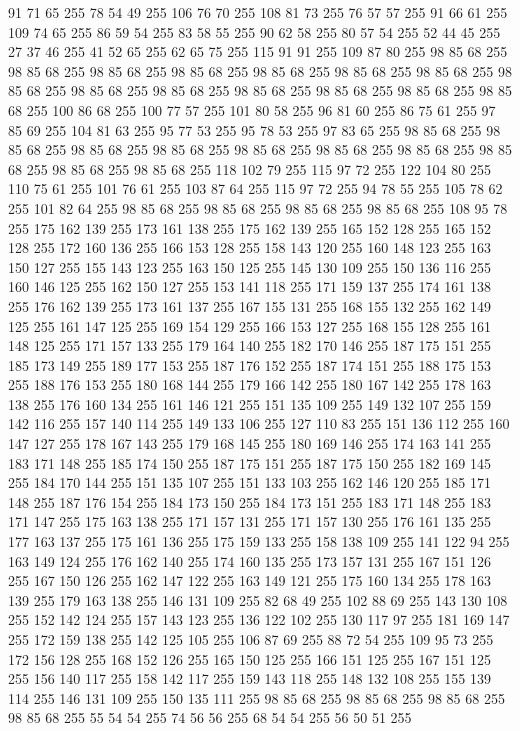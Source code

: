 91 71 65 255 78 54 49 255 106 76 70 255 108 81 73 255 76 57 57 255 91 66 61 255 109 74 65 255 86 59 54 255 83 58 55 255 90 62 58 255 80 57 54 255 52 44 45 255 27 37 46 255 41 52 65 255 62 65 75 255 115 91 91 255 109 87 80 255 98 85 68 255 98 85 68 255 98 85 68 255 98 85 68 255 98 85 68 255 98 85 68 255 98 85 68 255 98 85 68 255 98 85 68 255 98 85 68 255 98 85 68 255 98 85 68 255 98 85 68 255 98 85 68 255 100 86 68 255 100 77 57 255 101 80 58 255 96 81 60 255 86 75 61 255 97 85 69 255 104 81 63 255 95 77 53 255 95 78 53 255 97 83 65 255 98 85 68 255 98 85 68 255 98 85 68 255 98 85 68 255 98 85 68 255 98 85 68 255 98 85 68 255 98 85 68 255 98 85 68 255 98 85 68 255 118 102 79 255 115 97 72 255 122 104 80 255 110 75 61 255 101 76 61 255 103 87 64 255 115 97 72 255 94 78 55 255 105 78 62 255 101 82 64 255 98 85 68 255 98 85 68 255 98 85 68 255
98 85 68 255 108 95 78 255 175 162 139 255 173 161 138 255 175 162 139 255 165 152 128 255 165 152 128 255 172 160 136 255 166 153 128 255 158 143 120 255 160 148 123 255 163 150 127 255 155 143 123 255 163 150 125 255 145 130 109 255 150 136 116 255 160 146 125 255 162 150 127 255 153 141 118 255 171 159 137 255 174 161 138 255 176 162 139 255 173 161 137 255 167 155 131 255 168 155 132 255 162 149 125 255 161 147 125 255 169 154 129 255 166 153 127 255 168 155 128 255 161 148 125 255 171 157 133 255 179 164 140 255 182 170 146 255 187 175 151 255 185 173 149 255 189 177 153 255 187 176 152 255 187 174 151 255 188 175 153 255 188 176 153 255 180 168 144 255 179 166 142 255 180 167 142 255 178 163 138 255 176 160 134 255 161 146 121 255 151 135 109 255 149 132 107 255 159 142 116 255 157 140 114 255 149 133 106 255 127 110 83 255 151 136 112 255 160 147 127 255 178 167 143 255 179 168 145 255 180 169 146 255 174 163 141 255 183 171 148 255 185 174 150 255 187 175 151 255 187 175 150 255 182 169 145 255
184 170 144 255 151 135 107 255 151 133 103 255 162 146 120 255 185 171 148 255 187 176 154 255 184 173 150 255 184 173 151 255 183 171 148 255 183 171 147 255 175 163 138 255 171 157 131 255 171 157 130 255 176 161 135 255 177 163 137 255 175 161 136 255 175 159 133 255 158 138 109 255 141 122 94 255 163 149 124 255 176 162 140 255 174 160 135 255 173 157 131 255 167 151 126 255 167 150 126 255 162 147 122 255 163 149 121 255 175 160 134 255 178 163 139 255 179 163 138 255 146 131 109 255 82 68 49 255 102 88 69 255 143 130 108 255 152 142 124 255 157 143 123 255 136 122 102 255 130 117 97 255 181 169 147 255 172 159 138 255 142 125 105 255 106 87 69 255 88 72 54 255 109 95 73 255 172 156 128 255 168 152 126 255 165 150 125 255 166 151 125 255 167 151 125 255 156 140 117 255 158 142 117 255 159 143 118 255 148 132 108 255 155 139 114 255 146 131 109 255 150 135 111 255 98 85 68 255 98 85 68 255 98 85 68 255 98 85 68 255 55 54 54 255 74 56 56 255 68 54 54 255 56 50 51 255
